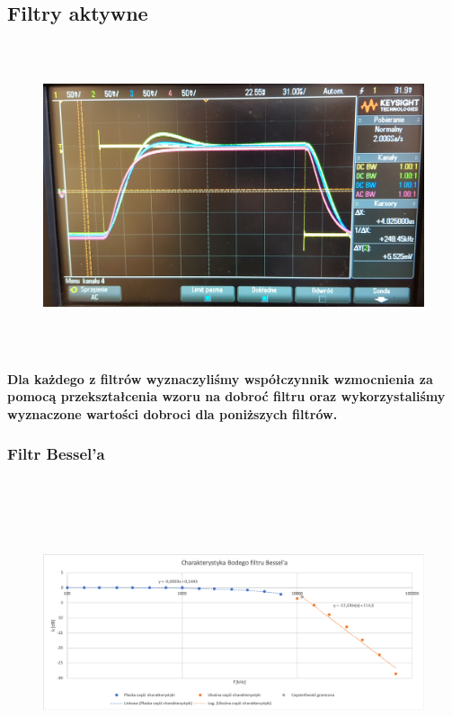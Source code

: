 \documentclass[a4paper,12pt]{article}
\begin{document}
\begin{justify}
\newpage

\subsection{Filtry aktywne}

\begin{figure}[h]
\centering
\includegraphics[width=15cm, height=9cm]{aktywne}
\end{figure}

\paragraph{Dla każdego z filtrów wyznaczyliśmy współczynnik wzmocnienia za pomocą przekształcenia wzoru na dobroć filtru oraz wykorzystaliśmy wyznaczone wartości dobroci dla poniższych filtrów.}

\subsubsection{Filtr Bessel'a}

\begin{figure}[h]
\centering
\includegraphics[width=15cm, height=9cm]{4_wykr_bessel}
\end{figure}


\end{justify}
\end{document}
